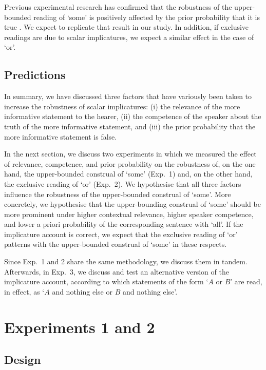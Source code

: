\documentclass[12pt]{article}
\begin{document}
Previous experimental research has confirmed that the robustness of the upper-bounded reading of `some' is positively affected by the prior probability that it is true \citep{degen2015}. We expect to replicate that result in our study. In addition, if exclusive readings are due to scalar implicatures, we expect a similar effect in the case of `or'.

\subsection*{Predictions}

In summary, we have discussed three factors that have variously been taken to increase the
robustness of scalar implicatures: (i) the relevance of the more informative statement to the
hearer, (ii) the competence of the speaker about the truth of the more informative statement,
and (iii) the prior probability that the more informative statement is false.

In the next section, we discuss two experiments in which we measured the effect of relevance, competence, and prior probability on the robustness of, on the one hand, the upper-bounded construal of `some' (Exp.\ 1) and, on the other hand, the exclusive reading of `or' (Exp.\ 2). We hypothesise that all three factors influence the robustness of the upper-bounded construal of `some'. More concretely, we hypothesise that the upper-bounding construal of `some' should be  more prominent under higher contextual relevance, higher speaker competence, and lower a priori probability of the corresponding sentence with `all'. If the implicature account is correct, we expect that the exclusive reading of `or' patterns with the upper-bounded construal of `some' in these respects.

Since Exp.\ 1 and 2 share the same methodology, we discuss them in tandem. Afterwards, in Exp.\ 3, we discuss and test an alternative version of the implicature account, according to which statements of the form `$A$ or $B$' are read, in effect, as `$A$ and nothing else or $B$ and nothing else'. 

\section{Experiments 1 and 2}
\subsection*{Design}
\end{document}
